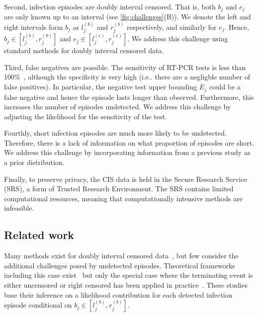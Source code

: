 \documentclass[12pt]{article}
\makeatletter
\DeclareRobustCommand\onedot{\futurelet\@let@token\@onedot}
\def\@onedot{\ifx\@let@token.\else.\null\fi\xspace}
\def\ie{i.e\onedot} \def\Ie{{I.e}\onedot}
\makeatother
\begin{document}
Second, infection episodes are doubly interval censored.
That is, both $b_j$ and $e_j$ are only known up to an interval (see \cref{fig:challenges}(B)).
We denote the left and right intervals form $b_j$ as $l_j^{(b)}$ and $r_j^{(b)}$ respectively, and similarly for $e_j$.
Hence, $b_j \in [l_j^{(b)}, r_j^{(b)}]$ and $e_j \in [l_j^{(e)}, r_j^{(e)}]$.
We address this challenge using standard methods for doubly interval censored data.

Third, false negatives are possible.
The sensitivity of RT-PCR tests is less than 100\%~, although the specificity is very high (\ie there are a negligble number of false positives).
In particular, the negative test upper bounding $E_j$ could be a false negative and hence the episode lasts longer than observed.
Furthermore, this increases the number of episodes undetected.
We address this challenge by adjusting the likelihood for the sensitivity of the test.

Fourthly, short infection episodes are much more likely to be undetected.
Therefore, there is a lack of information on what proportion of episodes are short.
We address this challenge by incorporating information from a previous study as a prior distribution.

Finally, to preserve privacy, the CIS data is held in the Secure Research Service (SRS), a form of Trusted Research Environment.
The SRS contains limited computational resources, meaning that computationally intensive methods are infeasible.

\subsection{Related work}


Many methods exist for doubly interval censored data~\citep{sunStatistical,bogaertsSurvival}, but few consider the additional challenges posed by undetected episodes.
Theoretical frameworks including this case exist~\citep{turnbullEmpirical,dempsterMaximum} but only the special case where the terminating event is either uncensored or right censored has been applied in practice~\citep[e.g.][]{sunEmpirical,bacchettiNonparametric,shenNonparametric}.
These studies base their inference on a likelihood contribution for each detected infection episode conditional on $b_j \in [l_j^{(b)}, r_j^{(b)}]$.
\end{document}
